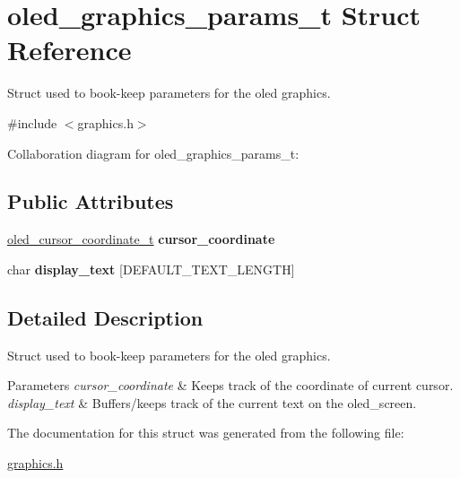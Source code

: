 \hypertarget{structoled__graphics__params__t}{}\section{oled\+\_\+graphics\+\_\+params\+\_\+t Struct Reference}
\label{structoled__graphics__params__t}


Struct used to book-\/keep parameters for the oled graphics.  




{\ttfamily \#include $<$graphics.\+h$>$}



Collaboration diagram for oled\+\_\+graphics\+\_\+params\+\_\+t\+:
\subsection*{Public Attributes}
\begin{DoxyCompactItemize}
\item 
\mbox{\label{structoled__graphics__params__t_ae5c9feac043e1ac73912a888ff0dc565}} 
\hyperlink{structoled__cursor__coordinate__t}{oled\+\_\+cursor\+\_\+coordinate\+\_\+t} {\bfseries cursor\+\_\+coordinate}
\item 
\mbox{\label{structoled__graphics__params__t_ae4c9acfadcda617477e284fa42f7709f}} 
char {\bfseries display\+\_\+text} \mbox{[}D\+E\+F\+A\+U\+L\+T\+\_\+\+T\+E\+X\+T\+\_\+\+L\+E\+N\+G\+TH\mbox{]}
\end{DoxyCompactItemize}


\subsection{Detailed Description}
Struct used to book-\/keep parameters for the oled graphics. 


\begin{DoxyParams}{Parameters}
{\em cursor\+\_\+coordinate} & Keeps track of the coordinate of current cursor. \\
\hline
{\em display\+\_\+text} & Buffers/keeps track of the current text on the oled\+\_\+screen. \\
\hline
\end{DoxyParams}


The documentation for this struct was generated from the following file\+:\begin{DoxyCompactItemize}
\item 
\hyperlink{graphics_8h}{graphics.\+h}\end{DoxyCompactItemize}
